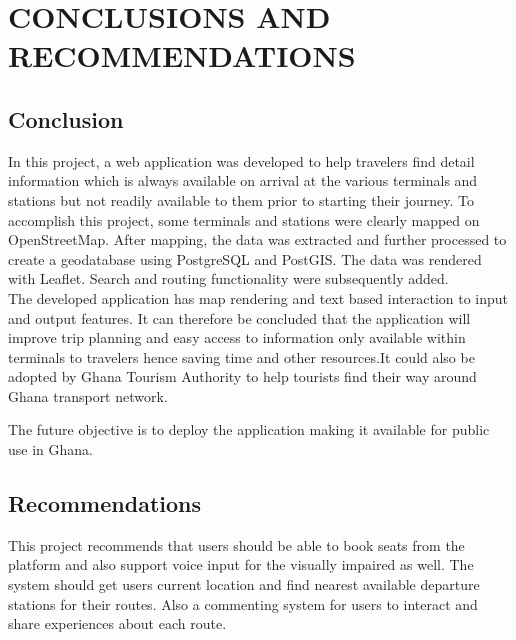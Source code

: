 
\chapter{CONCLUSIONS AND RECOMMENDATIONS} %



\ifpdf
    \graphicspath{{5/figures/PNG/}{5/figures/PDF/}{5/figures/}}
\else
    \graphicspath{{5/figures/EPS/}{5/figures/}}
\fi

\section{Conclusion}
In this project, a web application was developed to help travelers find detail information which is always available on arrival at the various terminals and stations but not readily available to them prior to starting their journey. To accomplish this project, some terminals and stations were clearly mapped on OpenStreetMap. After mapping, the data was extracted and further processed to create a geodatabase using PostgreSQL and PostGIS. The data was rendered with Leaflet. Search and routing functionality were subsequently added.\\ The developed application has map rendering and text based interaction to input and output features. It can therefore be concluded that the application will improve trip planning and easy access to information only available within terminals to travelers hence saving time and other resources.It could also be adopted by Ghana Tourism Authority to help tourists find their way around Ghana transport network.

The future objective is to deploy the application making it available for public use in Ghana.

\section{Recommendations}
This project recommends that users should be able to book seats from the platform and also support voice input for the visually impaired as well. The system should get users current location and find nearest available departure stations for their routes. Also a commenting system for users to interact and share experiences about each route.


